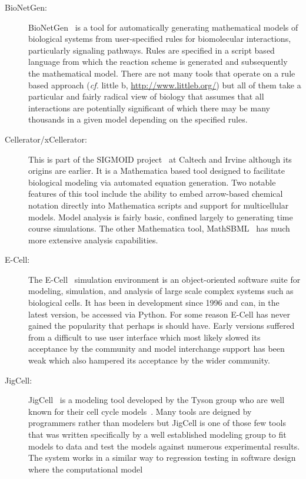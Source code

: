 \documentclass[12pt]{article}
\begin{document}
\begin{description}
%
\item[BioNetGen:] BioNetGen~\citep{Blinov:2004} is a tool for automatically generating
mathematical models of biological systems from user-specified rules
for biomolecular interactions, particularly signaling pathways.
Rules are specified in a script based language from which the
reaction scheme is generated and subsequently the mathematical
model. There are not many tools that operate on a rule based approach ({\em cf.} little b,
\url{http://www.littleb.org/}) but all of them take a particular and fairly radical view of
biology that assumes that all interactions are potentially
significant of which there may be many thousands in a given model
depending on the specified rules.
%
\item[Cellerator/xCellerator:] This is part of the SIGMOID project~\citep{Sigmoid:2005}
at Caltech and Irvine although its origins are earlier. It is a
Mathematica based tool designed to facilitate biological modeling
via automated equation generation. Two notable features of this tool
include the ability to embed arrow-based chemical notation directly
into Mathematica scripts and support for multicellular models. Model
analysis is fairly basic, confined largely to generating time course
simulations. The other Mathematica tool,
MathSBML~\citep{Shapiro:2004} has much more extensive analysis
capabilities.
%
\item[E-Cell:] The E-Cell~\citep{ECELL} simulation environment is an
object-oriented software suite for modeling, simulation, and
analysis of large scale complex systems such as biological cells. It
has been in development since 1996 and can, in the latest version,
be accessed via Python. For some reason E-Cell has never gained the popularity that perhaps is should have.
Early versions suffered from a difficult to use user interface which
most likely slowed its acceptance by the community and model interchange support has been weak which also hampered its acceptance by the wider community.
%
\item[JigCell:] JigCell~\citep{VassJigCell:2004} is a modeling tool
developed by the Tyson group who are well known for their cell cycle
models~\citep{TysonBioessay2002}. Many tools are deigned by
programmers rather than modelers but JigCell is one of those few
tools that was written specifically by a well established modeling
group to fit models to data and test the models against numerous
experimental results. The system works in a similar way to
regression testing in software design where the computational model

\end{description}
\end{document}
